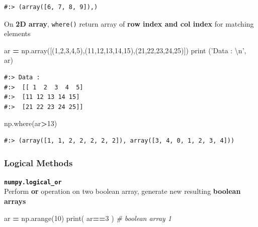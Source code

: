 \documentclass[
]{book}
\newenvironment{Shaded}{\begin{snugshade}}{\end{snugshade}}
\newcommand{\BuiltInTok}[1]{#1}
\newcommand{\CharTok}[1]{\textcolor[rgb]{0.5,0.5,0.5}{#1}}
\newcommand{\CommentTok}[1]{\textcolor[rgb]{0.37,0.37,0.37}{\textit{#1}}}
\newcommand{\DecValTok}[1]{\textcolor[rgb]{0.06,0.06,0.06}{#1}}
\newcommand{\NormalTok}[1]{#1}
\newcommand{\OperatorTok}[1]{\textcolor[rgb]{0.43,0.43,0.43}{\textbf{#1}}}
\newcommand{\StringTok}[1]{\textcolor[rgb]{0.5,0.5,0.5}{#1}}
\begin{document}
\begin{verbatim}
#:> (array([6, 7, 8, 9]),)
\end{verbatim}

On \textbf{2D array}, \texttt{where()} return array of \textbf{row index and col index} for matching elements

\begin{Shaded}
\begin{Highlighting}[]
\NormalTok{ar }\OperatorTok{=}\NormalTok{ np.array([(}\DecValTok{1}\NormalTok{,}\DecValTok{2}\NormalTok{,}\DecValTok{3}\NormalTok{,}\DecValTok{4}\NormalTok{,}\DecValTok{5}\NormalTok{),(}\DecValTok{11}\NormalTok{,}\DecValTok{12}\NormalTok{,}\DecValTok{13}\NormalTok{,}\DecValTok{14}\NormalTok{,}\DecValTok{15}\NormalTok{),(}\DecValTok{21}\NormalTok{,}\DecValTok{22}\NormalTok{,}\DecValTok{23}\NormalTok{,}\DecValTok{24}\NormalTok{,}\DecValTok{25}\NormalTok{)])}
\BuiltInTok{print}\NormalTok{ (}\StringTok{'Data : }\CharTok{\textbackslash{}n}\StringTok{'}\NormalTok{, ar)}
\end{Highlighting}
\end{Shaded}

\begin{verbatim}
#:> Data : 
#:>  [[ 1  2  3  4  5]
#:>  [11 12 13 14 15]
#:>  [21 22 23 24 25]]
\end{verbatim}

\begin{Shaded}
\begin{Highlighting}[]
\NormalTok{np.where(ar}\OperatorTok{>}\DecValTok{13}\NormalTok{)}
\end{Highlighting}
\end{Shaded}

\begin{verbatim}
#:> (array([1, 1, 2, 2, 2, 2, 2]), array([3, 4, 0, 1, 2, 3, 4]))
\end{verbatim}

\hypertarget{logical-methods}{%
\subsubsection{Logical Methods}\label{logical-methods}}

\textbf{\texttt{numpy.logical\_or}}\\
Perform \textbf{or} operation on two boolean array, generate new resulting \textbf{boolean arrays}

\begin{Shaded}
\begin{Highlighting}[]
\NormalTok{ar }\OperatorTok{=}\NormalTok{ np.arange(}\DecValTok{10}\NormalTok{)}
\BuiltInTok{print}\NormalTok{( ar}\OperatorTok{==}\DecValTok{3}\NormalTok{ )  }\CommentTok{# boolean array 1}
\end{Highlighting}
\end{Shaded}
\end{document}
